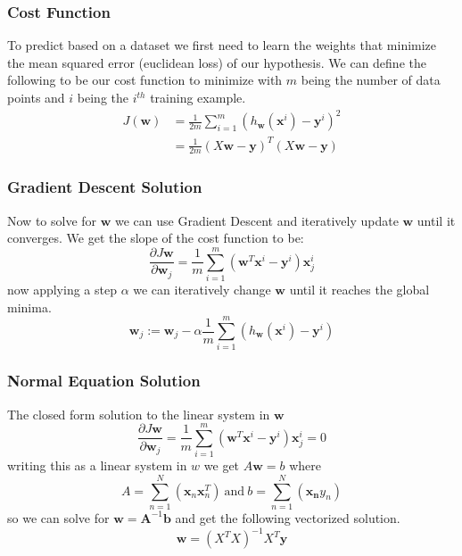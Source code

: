 \documentclass[12pt]{article}
\begin{document}
    \subsubsection{Cost Function}
        To predict based on a dataset we first need to learn the weights that minimize the mean squared error (euclidean loss) of our hypothesis. We can define the following to be our cost function to
        minimize with $m$ being the number of data points and $i$ being the $i^{th}$ training example.
        \begin{align*}
            J(\boldsymbol{w}) &= \frac{1}{2m}\sum_{i=1}^{m}(h_{\boldsymbol{w}}(\boldsymbol{x}^i) - \boldsymbol{y}^i)^2 \\
            &= \frac{1}{2m}(X\boldsymbol{w} - \boldsymbol{y})^T(X\boldsymbol{w} - \boldsymbol{y})
        \end{align*}


    \subsubsection{Gradient Descent Solution}
        Now to solve for $\boldsymbol{w}$ we can use Gradient Descent and iteratively update $\boldsymbol{w}$ until it converges. We get the slope of the cost function to be:
        $$ \frac{\partial J{\boldsymbol{w}}}{\partial \boldsymbol{w}_j} = \frac{1}{m}\sum_{i=1}^m(\boldsymbol{w}^T\boldsymbol{x}^{i}-\boldsymbol{y}^{i})\boldsymbol{x}_{j}^i $$
        now applying a step $\alpha$ we can iteratively change $\boldsymbol{w}$ until it reaches the global minima. 
        $$ \boldsymbol{w}_j := \boldsymbol{w}_j - \alpha \frac{1}{m}\sum_{i=1}^{m}(h_{\boldsymbol{w}}(\boldsymbol{x}^i) - \boldsymbol{y}^i) $$

    \subsubsection{Normal Equation Solution}
        The closed form solution to the linear system in $\boldsymbol{w}$
        $$ \frac{\partial J{\boldsymbol{w}}}{\partial \boldsymbol{w}_j} = \frac{1}{m}\sum_{i=1}^m(\boldsymbol{w}^T\boldsymbol{x}^{i}-\boldsymbol{y}^{i})\boldsymbol{x}_{j}^i = 0 $$
        writing this as a linear system in $w$ we get $A\boldsymbol{w} = b$ where
        $$ A = \sum_{n=1}^N(\boldsymbol{x}_n \boldsymbol{x}_n^T) \ \textrm{and} \ b = \sum_{n=1}^N(\boldsymbol{x_n} y_n) $$
        so we can solve for $\boldsymbol{w} = \boldsymbol{A}^{-1}\boldsymbol{b}$ and get the following vectorized solution.
        $$ \boldsymbol{w} = (X^TX)^{-1}X^T\boldsymbol{y} $$
\end{document}
